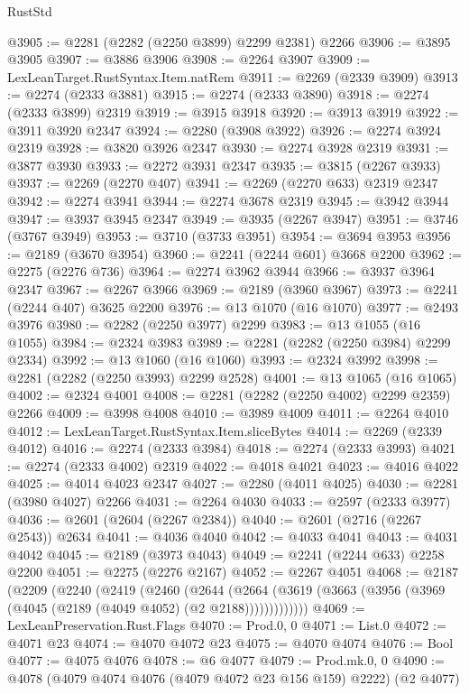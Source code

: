 \begin{lexlean}{RustStd}
\begin{coremodule}
{\begin{coremodule}
{{{{{{{{{{{{{{@3905 := @2281 (@2282 (@2250 @3899) @2299 @2381) @2266
@3906 := @3895 @3905
@3907 := @3886 @3906
@3908 := @2264 @3907
@3909 := LexLeanTarget.RustSyntax.Item.natRem
@3911 := @2269 (@2339 @3909)
@3913 := @2274 (@2333 @3881)
@3915 := @2274 (@2333 @3890)
@3918 := @2274 (@2333 @3899) @2319
@3919 := @3915 @3918
@3920 := @3913 @3919
@3922 := @3911 @3920 @2347
@3924 := @2280 (@3908 @3922)
@3926 := @2274 @3924 @2319
@3928 := @3820 @3926 @2347
@3930 := @2274 @3928 @2319
@3931 := @3877 @3930
@3933 := @2272 @3931 @2347
@3935 := @3815 (@2267 @3933)
@3937 := @2269 (@2270 @407)
@3941 := @2269 (@2270 @633) @2319 @2347
@3942 := @2274 @3941
@3944 := @2274 @3678 @2319
@3945 := @3942 @3944
@3947 := @3937 @3945 @2347
@3949 := @3935 (@2267 @3947)
@3951 := @3746 (@3767 @3949)
@3953 := @3710 (@3733 @3951)
@3954 := @3694 @3953
@3956 := @2189 (@3670 @3954)
@3960 := @2241 (@2244 @601) @3668 @2200
@3962 := @2275 (@2276 @736)
@3964 := @2274 @3962 @3944
@3966 := @3937 @3964 @2347
@3967 := @2267 @3966
@3969 := @2189 (@3960 @3967)
@3973 := @2241 (@2244 @407) @3625 @2200
@3976 := @13 @1070 (@16 @1070)
@3977 := @2493 @3976
@3980 := @2282 (@2250 @3977) @2299
@3983 := @13 @1055 (@16 @1055)
@3984 := @2324 @3983
@3989 := @2281 (@2282 (@2250 @3984) @2299 @2334)
@3992 := @13 @1060 (@16 @1060)
@3993 := @2324 @3992
@3998 := @2281 (@2282 (@2250 @3993) @2299 @2528)
@4001 := @13 @1065 (@16 @1065)
@4002 := @2324 @4001
@4008 := @2281 (@2282 (@2250 @4002) @2299 @2359) @2266
@4009 := @3998 @4008
@4010 := @3989 @4009
@4011 := @2264 @4010
@4012 := LexLeanTarget.RustSyntax.Item.sliceBytes
@4014 := @2269 (@2339 @4012)
@4016 := @2274 (@2333 @3984)
@4018 := @2274 (@2333 @3993)
@4021 := @2274 (@2333 @4002) @2319
@4022 := @4018 @4021
@4023 := @4016 @4022
@4025 := @4014 @4023 @2347
@4027 := @2280 (@4011 @4025)
@4030 := @2281 (@3980 @4027) @2266
@4031 := @2264 @4030
@4033 := @2597 (@2333 @3977)
@4036 := @2601 (@2604 (@2267 @2384))
@4040 := @2601 (@2716 (@2267 @2543)) @2634
@4041 := @4036 @4040
@4042 := @4033 @4041
@4043 := @4031 @4042
@4045 := @2189 (@3973 @4043)
@4049 := @2241 (@2244 @633) @2258 @2200
@4051 := @2275 (@2276 @2167)
@4052 := @2267 @4051
@4068 := @2187
    (@2209
      (@2240
        (@2419
          (@2460
            (@2644
              (@2664 (@3619 (@3663 (@3956 (@3969 (@4045 (@2189 (@4049 @4052) (@2 @2188)))))))))))))
@4069 := LexLeanPreservation.Rust.Flags
@4070 := Prod.{0, 0}
@4071 := List.{0}
@4072 := @4071 @23
@4074 := @4070 @4072 @23
@4075 := @4070 @4074
@4076 := Bool
@4077 := @4075 @4076
@4078 := @6 @4077
@4079 := Prod.mk.{0, 0}
@4090 := @4078 (@4079 @4074 @4076 (@4079 @4072 @23 @156 @159) @2222) (@2 @4077)
}}}}}}}}}}}}}}
\end{coremodule}}
\end{coremodule}
\end{lexlean}
